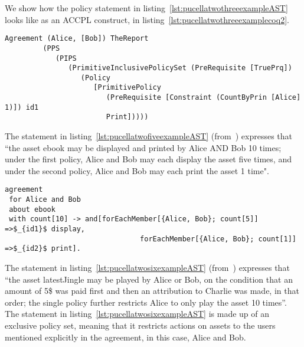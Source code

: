 We show how the policy statement in listing~\ref{lst:pucellatwothreeexampleAST} looks like as an \ac{ACCPL} construct, in listing~\ref{lst:pucellatwothreeexamplecoq2}.

\begin{minipage}[c]{0.95\textwidth}
\begin{lstlisting}
Agreement (Alice, [Bob]) TheReport
         (PPS
            (PIPS
               (PrimitiveInclusivePolicySet (PreRequisite [TruePrq])
                  (Policy
                     [PrimitivePolicy
                        (PreRequisite [Constraint (CountByPrin [Alice] 1)]) id1
                        Print]))))
\end{lstlisting}
\end{minipage} 

%



%

The statement in listing~\ref{lst:pucellatwofiveexampleAST} (from~\cite{pucella2006}) expresses that ``the asset ebook may be displayed and printed by Alice AND Bob 10 times; under the first policy, Alice and Bob may each display the asset five times, and under the second policy, Alice and Bob may each print the asset 1 time".


\lstset{language=Pucella2006}
\begin{minipage}[c]{0.95\textwidth}
\begin{lstlisting}[frame=single, caption={Agreement of Example 2.5}, label={lst:pucellatwofiveexampleAST}, mathescape]
agreement
 for Alice and Bob 
 about ebook 
 with count[10] -> and[forEachMember[{Alice, Bob}; count[5]] =>$_{id1}$ display, 
                                forEachMember[{Alice, Bob}; count[1]] =>$_{id2}$ print].
\end{lstlisting}
\end{minipage} 
%


The statement in listing~\ref{lst:pucellatwosixexampleAST} (from~\cite{pucella2006}) expresses that ``the asset latestJingle may be played by Alice or Bob, on the condition that an amount of 5\$ was paid first and then an attribution to Charlie was made, in that order; the single policy further restricts Alice to only play the asset 10 times''. The statement in listing~\ref{lst:pucellatwosixexampleAST} is made up of an exclusive policy set, meaning that it restricts actions on assets to the users mentioned explicitly in the agreement, in this case, Alice and Bob.

